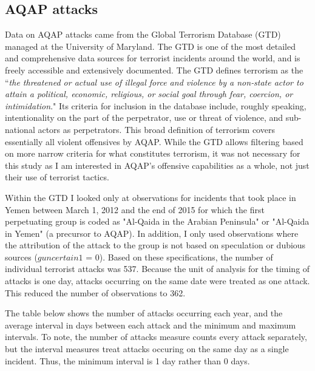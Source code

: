\documentclass[letterpaper,12pt]{article}
\theoremstyle{definition}
\begin{document}
\subsection{AQAP attacks}

Data on AQAP attacks came from the Global Terrorism Database (GTD) managed at the University of Maryland. The GTD is one of the most detailed and comprehensive data sources for terrorist incidents around the world, and is freely accessible and extensively documented. The GTD defines terrorism as the ``\textit{the threatened or actual use of illegal force and violence by
a non‐state actor to attain a political, economic, religious, or social goal through fear, coercion,
or intimidation}." Its criteria for inclusion in the database include, roughly speaking, intentionality on the part of the perpetrator, use or threat of violence, and sub-national actors as perpetrators. This broad definition of terrorism covers essentially all violent offensives by AQAP. While the GTD allows filtering based on more narrow criteria for what constitutes terrorism, it was not necessary for this study as I am interested in AQAP's offensive capabilities as a whole, not just their use of terrorist tactics.

Within the GTD I looked only at observations for incidents that took place in Yemen between March 1, 2012 and the end of 2015 for which the first perpetuating group is coded as "Al-Qaida in the Arabian Peninsula" or "Al-Qaida in Yemen" (a precursor to AQAP). In addition, I only used observations where the attribution of the attack to the group is not based on speculation or dubious sources ($guncertain1$ = 0). Based on these specifications, the number of individual terrorist attacks was 537. Because the unit of analysis for the timing of attacks is one day, attacks occurring on the same date were treated as one attack. This reduced the number of observations to 362.

The table below shows the number of attacks occurring each year, and the average interval in days between each attack and the minimum and maximum intervals. To note, the number of attacks measure counts every attack separately, but the interval measures treat attacks occuring on the same day as a single incident. Thus, the minimum interval is 1 day rather than 0 days.\\
\end{document}
